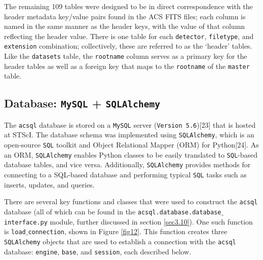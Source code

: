\documentclass[10pt,journal,compsoc]{IEEEtran}
\begin{document}
The remaining 109 tables were designed to be in direct correspondence with the header metadata key/value pairs found in the ACS FITS files; each column is named in the same manner as
the header keys, with the value of that column reflecting the header value. There is one table for each \texttt{detector}, \texttt{filetype}, and \texttt{extension} combination;
collectively, these are referred to as the `header' tables.  Like the \texttt{datasets} table, the \texttt{rootname} column serves as a primary key for the header tables as well
as a foreign key that maps to the \texttt{rootname} of the \texttt{master} table.


\subsection{Database: \texttt{MySQL} + \texttt{SQLAlchemy}} \label{sec3.6}

The \texttt{acsql} database is stored on a \texttt{MySQL} server (\texttt{Version 5.6})[23] that is hosted at STScI.  The database schema was implemented using \texttt{SQLAlchemy}, which
is an open-source \texttt{SQL} toolkit and Object Relational Mapper (ORM) for Python[24].  As an ORM, \texttt{SQLAlchemy} enables Python classes to be easily translated to
\texttt{SQL}-based database tables, and vice versa.  Additionally, \texttt{SQLAlchemy} provides methods for connecting to a SQL-based database and performing typical \texttt{SQL}
tasks such as inserts, updates, and queries.

There are several key functions and classes that were used to construct the \texttt{acsql} database (all of which can be found in the \texttt{acsql.database.database$\_$interface.py}
module, further discussed in section \ref{sec3.10}). One such function is \texttt{load$\_$connection}, shown in Figure \ref{fig12}.  This function creates three \texttt{SQLAlchemy}
objects that are used to establish a connection with the \texttt{acsql} database: \texttt{engine}, \texttt{base}, and \texttt{session}, each described below.
\end{document}
